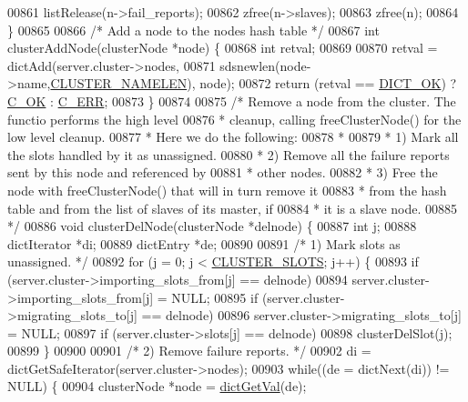\begin{DoxyCode}
{{{{{{{{{{{00861     listRelease(n->fail\_reports);
00862     zfree(n->slaves);
00863     zfree(n);
00864 \}
00865 
00866 \textcolor{comment}{/* Add a node to the nodes hash table */}
00867 \textcolor{keywordtype}{int} clusterAddNode(clusterNode *node) \{
00868     \textcolor{keywordtype}{int} retval;
00869 
00870     retval = dictAdd(server.cluster->nodes,
00871             sdsnewlen(node->name,\hyperlink{cluster_8h_ace7a882972eff7149675252938643b6e}{CLUSTER\_NAMELEN}), node);
00872     \textcolor{keywordflow}{return} (retval == \hyperlink{dict_8h_a2afecbeab8f7efbc183048f52f6d17e5}{DICT\_OK}) ? \hyperlink{server_8h_a303769ef1065076e68731584e758d3e1}{C\_OK} : \hyperlink{server_8h_af98ac28d5f4d23d7ed5985188e6fb7d1}{C\_ERR};
00873 \}
00874 
00875 \textcolor{comment}{/* Remove a node from the cluster. The functio performs the high level}
00876 \textcolor{comment}{ * cleanup, calling freeClusterNode() for the low level cleanup.}
00877 \textcolor{comment}{ * Here we do the following:}
00878 \textcolor{comment}{ *}
00879 \textcolor{comment}{ * 1) Mark all the slots handled by it as unassigned.}
00880 \textcolor{comment}{ * 2) Remove all the failure reports sent by this node and referenced by}
00881 \textcolor{comment}{ *    other nodes.}
00882 \textcolor{comment}{ * 3) Free the node with freeClusterNode() that will in turn remove it}
00883 \textcolor{comment}{ *    from the hash table and from the list of slaves of its master, if}
00884 \textcolor{comment}{ *    it is a slave node.}
00885 \textcolor{comment}{ */}
00886 \textcolor{keywordtype}{void} clusterDelNode(clusterNode *delnode) \{
00887     \textcolor{keywordtype}{int} j;
00888     dictIterator *di;
00889     dictEntry *de;
00890 
00891     \textcolor{comment}{/* 1) Mark slots as unassigned. */}
00892     \textcolor{keywordflow}{for} (j = 0; j < \hyperlink{cluster_8h_aa3e2cb951eebb16725ecc3f5beefd9fd}{CLUSTER\_SLOTS}; j++) \{
00893         \textcolor{keywordflow}{if} (server.cluster->importing\_slots\_from[j] == delnode)
00894             server.cluster->importing\_slots\_from[j] = NULL;
00895         \textcolor{keywordflow}{if} (server.cluster->migrating\_slots\_to[j] == delnode)
00896             server.cluster->migrating\_slots\_to[j] = NULL;
00897         \textcolor{keywordflow}{if} (server.cluster->slots[j] == delnode)
00898             clusterDelSlot(j);
00899     \}
00900 
00901     \textcolor{comment}{/* 2) Remove failure reports. */}
00902     di = dictGetSafeIterator(server.cluster->nodes);
00903     \textcolor{keywordflow}{while}((de = dictNext(di)) != NULL) \{
00904         clusterNode *node = \hyperlink{dict_8h_ae8d2cc391873b2bea2b87c4f80f43120}{dictGetVal}(de);
}}}}}}}}}}}
\end{DoxyCode}

